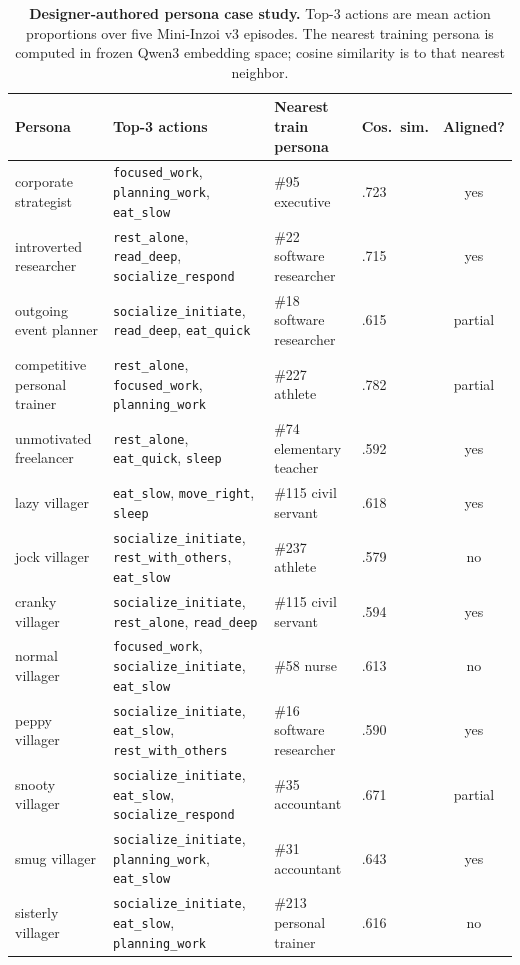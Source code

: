 \documentclass[conference]{IEEEtran}
\begin{document}
\begin{table}[t]
  \centering
  \scriptsize
  \caption{%
    \textbf{Designer-authored persona case study.}
    Top-3 actions are mean action proportions over five Mini-Inzoi v3 episodes.
    The nearest training persona is computed in frozen Qwen3 embedding space;
    cosine similarity is to that nearest neighbor.}
  \label{tab:designer_personas}
  \setlength{\tabcolsep}{3.5pt}
  \begin{tabular}{llllc}
    \toprule
    Persona & Top-3 actions & Nearest train persona & Cos.\ sim. & Aligned? \\
    \midrule
    corporate strategist & \texttt{focused\_work}, \texttt{planning\_work}, \texttt{eat\_slow} & \#95 executive & .723 & yes \\
    introverted researcher & \texttt{rest\_alone}, \texttt{read\_deep}, \texttt{socialize\_respond} & \#22 software researcher & .715 & yes \\
    outgoing event planner & \texttt{socialize\_initiate}, \texttt{read\_deep}, \texttt{eat\_quick} & \#18 software researcher & .615 & partial \\
    competitive personal trainer & \texttt{rest\_alone}, \texttt{focused\_work}, \texttt{planning\_work} & \#227 athlete & .782 & partial \\
    unmotivated freelancer & \texttt{rest\_alone}, \texttt{eat\_quick}, \texttt{sleep} & \#74 elementary teacher & .592 & yes \\
    lazy villager & \texttt{eat\_slow}, \texttt{move\_right}, \texttt{sleep} & \#115 civil servant & .618 & yes \\
    jock villager & \texttt{socialize\_initiate}, \texttt{rest\_with\_others}, \texttt{eat\_slow} & \#237 athlete & .579 & no \\
    cranky villager & \texttt{socialize\_initiate}, \texttt{rest\_alone}, \texttt{read\_deep} & \#115 civil servant & .594 & yes \\
    normal villager & \texttt{focused\_work}, \texttt{socialize\_initiate}, \texttt{eat\_slow} & \#58 nurse & .613 & no \\
    peppy villager & \texttt{socialize\_initiate}, \texttt{eat\_slow}, \texttt{rest\_with\_others} & \#16 software researcher & .590 & yes \\
    snooty villager & \texttt{socialize\_initiate}, \texttt{eat\_slow}, \texttt{socialize\_respond} & \#35 accountant & .671 & partial \\
    smug villager & \texttt{socialize\_initiate}, \texttt{planning\_work}, \texttt{eat\_slow} & \#31 accountant & .643 & yes \\
    sisterly villager & \texttt{socialize\_initiate}, \texttt{eat\_slow}, \texttt{planning\_work} & \#213 personal trainer & .616 & no \\
    \bottomrule
  \end{tabular}
\end{table}
\end{document}

